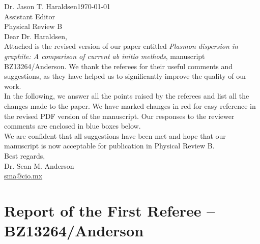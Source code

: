 \documentclass[aps,prb,10pt,endfloats]{revtex4-1}
\begin{document}
\noindent Dr. Jason T. Haraldsen\hfill{\today}\\
Assistant Editor\\
Physical Review B\\

\noindent Dear Dr. Haraldsen,\\

Attached is the revised version of our paper entitled \emph{Plasmon dispersion
in graphite: A comparison of current ab initio methods}, manuscript
BZ13264/Anderson. We thank the referees for their useful comments and
suggestions, as they have helped us to significantly improve the quality of our
work.\\

In the following, we answer all the points raised by the referees and list all
the changes made to the paper. We have marked changes in red for easy reference
in the revised PDF version of the manuscript. Our responses to the reviewer
comments are enclosed in blue boxes below.\\

We are confident that all suggestions have been met and hope that our manuscript
is now acceptable for publication in Physical Review B.\\

\noindent Best regards,\\

\noindent Dr. Sean M. Anderson\\
\href{mailto:sma@cio.mx}{sma@cio.mx}


\section{Report of the First Referee -- BZ13264/Anderson}
\end{document}
